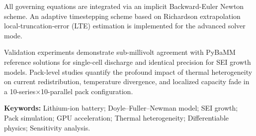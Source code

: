 All governing equations are integrated via an implicit Backward-Euler Newton scheme. An adaptive timestepping scheme based on Richardson extrapolation local-truncation-error (LTE) estimation is implemented for the advanced solver mode.

Validation experiments demonstrate sub-millivolt agreement with PyBaMM reference solutions for single-cell discharge and identical precision for SEI growth models. Pack-level studies quantify the profound impact of thermal heterogeneity on current redistribution, temperature divergence, and localized capacity fade in a 10-series$\times$10-parallel pack configuration.

\vspace{0.5em}
\noindent\textbf{Keywords:} Lithium-ion battery; Doyle--Fuller--Newman model; SEI growth; Pack simulation; GPU acceleration; Thermal heterogeneity; Differentiable physics; Sensitivity analysis.

\newpage
